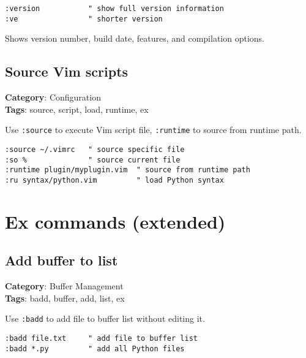 {{{{{{\begin{Exa*}{}
\begin{Verbatim}[fontsize=\footnotesize, breaklines, breakanywhere]
:version           " show full version information
:ve                " shorter version
\end{Verbatim}
\end{Exa*}

Shows version number, build date, features, and compilation options.

\section{Source Vim scripts}

\textbf{Category}: Configuration\\ \textbf{Tags}: source, script, load, runtime, ex
\vspace{0.5cm}

Use {\footnotesize \Verb§:source§} to execute Vim script file, {\footnotesize \Verb§:runtime§} to source from runtime path.

\begin{Exa*}{}
\begin{Verbatim}[fontsize=\footnotesize, breaklines, breakanywhere]
:source ~/.vimrc   " source specific file
:so %              " source current file
:runtime plugin/myplugin.vim  " source from runtime path
:ru syntax/python.vim         " load Python syntax
\end{Verbatim}
\end{Exa*}

\chapter{Ex commands (extended)}
\section{Add buffer to list}

\textbf{Category}: Buffer Management\\ \textbf{Tags}: badd, buffer, add, list, ex
\vspace{0.5cm}

Use {\footnotesize \Verb§:badd§} to add file to buffer list without editing it.

\begin{Exa*}{}
\begin{Verbatim}[fontsize=\footnotesize, breaklines, breakanywhere]
:badd file.txt     " add file to buffer list
:badd *.py         " add all Python files
\end{Verbatim}
\end{Exa*}

}}}}}}
